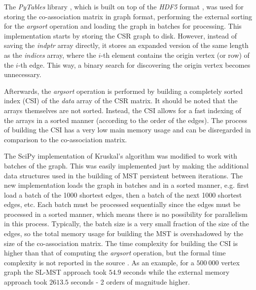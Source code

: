 The \emph{PyTables} library \cite{pytables}, which is built on top of the \emph{HDF5} format \cite{hdf5}, was used for storing the co-association matrix in graph format, performing the external sorting for the \emph{argsort} operation and loading the graph in batches for processing.
This implementation starts by storing the CSR graph to disk.
However, instead of saving the \emph{indptr} array directly, it stores an expanded version of the same length as the \emph{indices} array, where the $i$-th element contains the origin vertex (or row) of the $i$-th edge.
This way, a binary search for discovering the origin vertex becomes unnecessary.

Afterwards, the \emph{argsort} operation is performed by building a completely sorted index (CSI) \cite{AltetiAbad2007} of the \emph{data} array of the CSR matrix.
It should be noted that the arrays themselves are not sorted.
Instead, the CSI allows for a fast indexing of the arrays in a sorted manner (according to the order of the edges).
The process of building the CSI has a very low main memory usage and can be disregarded in comparison to the co-association matrix.

The SciPy implementation of Kruskal's algorithm was modified to work with batches of the graph.
This was easily implemented just by making the additional data structures used in the building of MST persistent between iterations.
The new implementation loads the graph in batches and in a sorted manner, e.g. first load a batch of the 1000 shortest edges, then a batch of the next 1000 shortest edges, etc.
Each batch must be processed sequentially since the edges must be processed in a sorted manner, which means there is no possibility for parallelism in this process.
Typically, the batch size is a very small fraction of the size of the edges, so the total memory usage for building the MST is overshadowed by the size of the co-association matrix.
The time complexity for building the CSI is higher than that of computing the \emph{argsort} operation, but the formal time complexity is not reported in the source \cite{AltetiAbad2007}.
As an example, for a $500 \: 000$ vertex graph the SL-MST approach took $54.9$ seconds while the external memory approach took $2613.5$ seconds - 2 orders of magnitude higher.